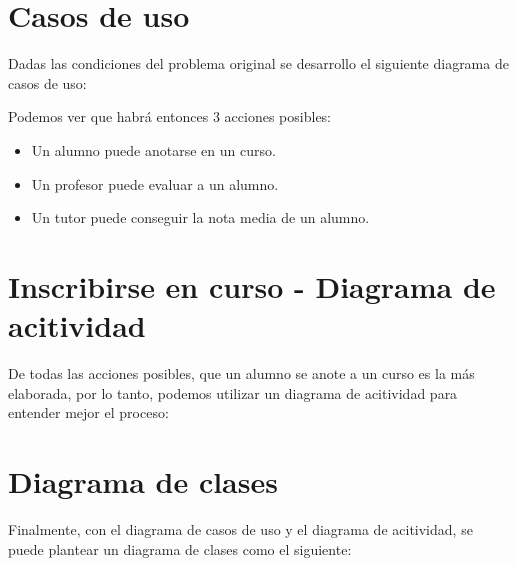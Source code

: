 \documentclass{article}
\begin{document}
\section{Casos de uso}

Dadas las condiciones del problema original se desarrollo el siguiente
diagrama de casos de uso:

\begin{figure}[H]
    \centering
    \scalebox{.75}{
        
    }
\end{figure}

Podemos ver que habrá entonces 3 acciones posibles:
\begin{itemize}
    \item Un alumno puede anotarse en un curso.
    \item Un profesor puede evaluar a un alumno.
    \item Un tutor puede conseguir la nota media de un alumno.
\end{itemize}

\pagebreak
\section{Inscribirse en curso - Diagrama de acitividad}
De todas las acciones posibles, que un alumno se anote a un curso es la más
elaborada, por lo tanto, podemos utilizar un diagrama de acitividad para
entender mejor el proceso:
\begin{figure}[H]
    \centering
    \scalebox{.75}{
        
    }
\end{figure}

\pagebreak
\section{Diagrama de clases}
Finalmente, con el diagrama de casos de uso y el diagrama de acitividad, se
puede plantear un diagrama de clases como el siguiente:
\begin{figure}[H]
    \centering
    \scalebox{.5}{
        
    }
\end{figure}
\end{document}
